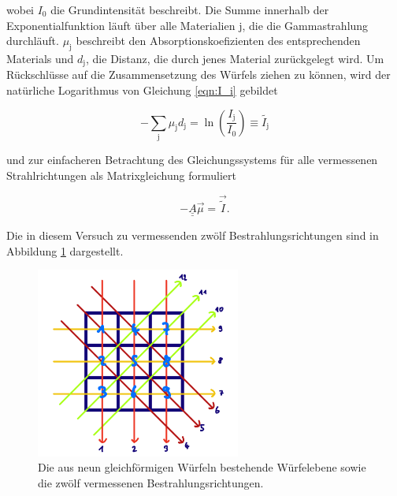           wobei $I_0$ die Grundintensität beschreibt. Die Summe innerhalb der Exponentialfunktion läuft über alle Materialien j, die die Gammastrahlung durchläuft. $\mu_{\text{j}}$ beschreibt den 
          Absorptionskoefizienten des entsprechenden Materials und $d_{\text{j}}$, die Distanz, die durch jenes Material zurückgelegt wird. Um Rückschlüsse auf die Zusammensetzung des Würfels ziehen zu können,
          wird der natürliche Logarithmus von Gleichung \ref{eqn:I_i} gebildet
          
          \begin{equation}
            -\sum_{\text{j}} \mu_{\text{j}} d_{\text{j}} = \ln\left(\frac{I_{\text{j}}}{I_0}\right) \equiv \tilde{I_{\text{j}}}
          \end{equation}

          und zur einfacheren Betrachtung des Gleichungssystems für alle vermessenen Strahlrichtungen als Matrixgleichung formuliert

          \begin{equation}
            -\underline{\underline{A}} \vec{\mu} = \vec{\tilde{I}}.
            \label{eqn:I_matrix}
          \end{equation}

          Die in diesem Versuch zu vermessenden zwölf Bestrahlungsrichtungen sind in Abbildung \ref{fig:Richtungen} dargestellt.

          \FloatBarrier

          \begin{figure}[h]
            \centering
            \includegraphics[width = 0.6\textwidth]{pictures/richtungen.png}
            \caption{Die aus neun gleichförmigen Würfeln bestehende Würfelebene sowie die zwölf vermessenen Bestrahlungsrichtungen.}
            \label{fig:Richtungen}
          \end{figure}
      

